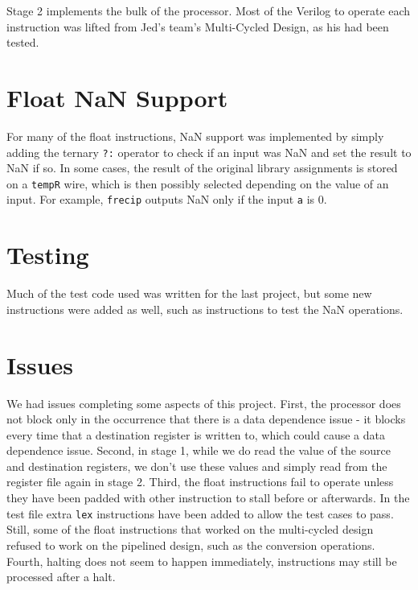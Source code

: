 \documentclass{sig-alternate-05-2015}
\begin{document}
Stage 2 implements the bulk of the processor. Most of the Verilog to operate each instruction was lifted from Jed's team's Multi-Cycled Design, as his had been tested.

\vfill\pagebreak

\section{Float NaN Support}

For many of the float instructions, NaN support was implemented by simply adding the ternary \texttt{?:} operator to check if an input was NaN and set the result to NaN if so. In some cases, the result of the original library assignments is stored on a \texttt{tempR} wire, which is then possibly selected depending on the value of an input. For example, \texttt{frecip} outputs NaN only if the input \texttt{a} is 0.

\section{Testing}

Much of the test code used was written for the last project, but some new instructions were added as well, such as instructions to test the NaN operations.

\section{Issues}

We had issues completing some aspects of this project. First, the processor does not block only in the occurrence that there is a data dependence issue - it blocks every time that a destination register is written to, which could cause a data dependence issue. Second, in stage 1, while we do read the value of the source and destination registers, we don't use these values and simply read from the register file again in stage 2. Third, the float instructions fail to operate unless they have been padded with other instruction to stall before or afterwards. In the test file extra \texttt{lex} instructions have been added to allow the test cases to pass. Still, some of the float instructions that worked on the multi-cycled design refused to work on the pipelined design, such as the conversion operations. Fourth, halting does not seem to happen immediately, instructions may still be processed after a halt.
\end{document}
